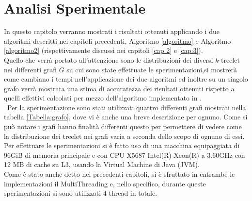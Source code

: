 \chapter{Analisi Sperimentale}
In questo capitolo verranno mostrati i risultati ottenuti applicando i due algoritmi descritti nei capitoli precedenti, Algoritmo \ref{algoritmo} e Algoritmo \ref{algoritmo2} (rispettivamente discussi nei capitoli \ref{cap 2} e \ref{cap:3}).\\
Quello che verrà portato all'attenzione sono le distribuzioni dei diversi $ k $-treelet nei differenti grafi $ G $ su cui sono state effettuate le sperimentazioni,si mostrerà come cambiano i tempi nell'applicazione dei due algoritmi ed inoltre su un singolo grafo verrà mostrata una stima di accuratezza dei risultati ottenuti rispetto a quelli effettivi calcolati per mezzo dell'algoritmo implementato in \cite{bressan2019motivo}.\\\
Per la sperimentazione sono stati utilizzati quattro differenti grafi mostrati nella tabella \ref{Tabella:grafo}, dove vi è anche una breve descrizione per ognuno.
Come si può notare i grafi hanno finalità differenti questo per permettere di vedere come la distribuzione dei treelet nei grafi varia a seconda dello scopo di ognuno di essi.\\
Per effettuare le sperimentazioni si è fatto uso di una macchina equipaggiata di 96GiB di memoria principale e con CPU X5687 Intel(R) Xeon(R) a 3.60GHz con 12 MB di cache su L3, usando la Virtual Machine di Java (JVM).\\
Come è stato anche detto nei precedenti capitoli, si è sfruttato in entrambe le implementazioni il MultiThreading e, nello specifico, durante queste sperimentazioni si sono utilizzati 4 thread in totale.
\\
\\
